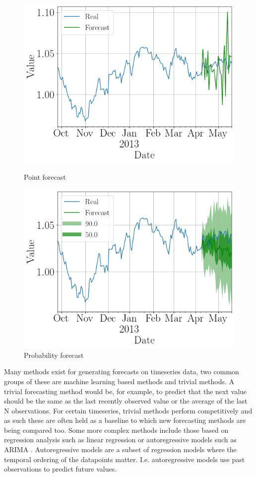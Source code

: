 \begin{figure}[htb]
  \centering
  \includegraphics[width=\linewidth]{./img/exchange_rate_point_forcast.png}
  \caption{Point forecast}
  \label{fig:example_timeseries_forecast_point}
  \endminipage\hfill
  \includegraphics[width=\linewidth]{./img/exchange_rate_prob_forcast.png}
  \caption{Probability forecast}
  \label{fig:example_timeseries_forecast_probabilistic}
  \endminipage\hfill
\end{figure}

Many methods exist for generating forecasts on timeseries data, two common groups of these are machine learning based methods and trivial methods. A trivial forecasting method would be, for example, to predict that the next value should be the same as the last recently observed value or the average of the last N observations. For certain timeseries, trivial methods perform competitively and as such these are often held as a baseline to which new forecasting methods are being compared too. Some more complex methods include those based on regression analysis such as linear regression or autoregressive models such as ARIMA \cite{hyndman_forecasting_3rd}. Autoregressive models are a subset of regression models where the temporal ordering of the datapoints matter. I.e. autoregressive models use past observations to predict future values.

